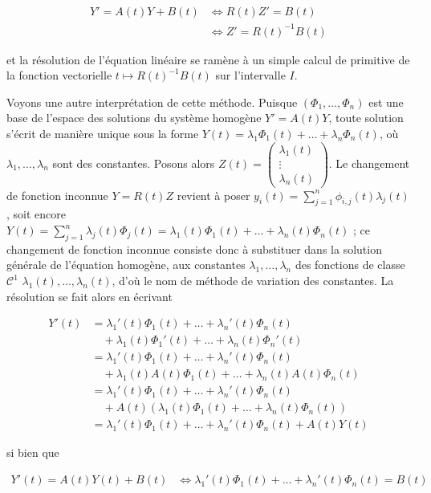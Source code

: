 \begin{align*} 
Y' = A(t)Y + B(t) &\Leftrightarrow R(t)Z' = B(t) \\
&\Leftrightarrow Z' = R(t)^{-1}B(t)
\end{align*}

et la résolution de l'équation linéaire se ramène à un simple calcul de
primitive de la fonction vectorielle
$t \mapsto R(t)^{-1}B(t)$ sur l'intervalle $I$.

Voyons une autre interprétation de cette méthode. Puisque
$(\Phi_1,\ldots,\Phi_n)$
est une base de l'espace des solutions du système homogène $Y' = A(t)Y$,
toute solution s'écrit de manière unique sous la forme $Y(t) =
\lambda_1\Phi_1(t) + \ldots + \lambda_n\Phi_n(t)$,
où
$\lambda_1,\ldots,\lambda_n$
sont des constantes. Posons alors $Z(t) = \begin{pmatrix} \lambda_1(t) \\ \vdots \\ \lambda_n(t) \end{pmatrix}$. Le
changement de fonction inconnue $Y = R(t)Z$ revient à poser
$y_i(t) = \sum_{j=1}^n \phi_{i,j}(t)\lambda_j(t)$, soit encore $Y(t) = \sum_{j=1}^n \lambda_j(t)\Phi_j(t) = \lambda_1(t)\Phi_1(t) + \ldots + \lambda_n(t)\Phi_n(t)$ ; ce changement de fonction inconnue
consiste donc à substituer dans la solution générale de l'équation
homogène, aux constantes
$\lambda_1,\ldots,\lambda_n$
des fonctions de classe $\mathcal{C}^1$
$\lambda_1(t),\ldots,\lambda_n(t)$,
d'où le nom de méthode de variation des constantes. La résolution se
fait alors en écrivant

\begin{align*} 
Y'(t) &= \lambda_1'(t)\Phi_1(t) + \ldots + \lambda_n'(t)\Phi_n(t) \\
&\quad + \lambda_1(t)\Phi_1'(t) + \ldots + \lambda_n(t)\Phi_n'(t) \\
&= \lambda_1'(t)\Phi_1(t) + \ldots + \lambda_n'(t)\Phi_n(t) \\
&\quad + \lambda_1(t)A(t)\Phi_1(t) + \ldots + \lambda_n(t)A(t)\Phi_n(t) \\
&= \lambda_1'(t)\Phi_1(t) + \ldots + \lambda_n'(t)\Phi_n(t) \\
&\quad + A(t)(\lambda_1(t)\Phi_1(t) + \ldots + \lambda_n(t)\Phi_n(t)) \\
&= \lambda_1'(t)\Phi_1(t) + \ldots + \lambda_n'(t)\Phi_n(t) + A(t)Y(t)
\end{align*}

si bien que

\begin{align*} 
Y'(t) = A(t)Y(t) + B(t) &\Leftrightarrow \lambda_1'(t)\Phi_1(t) + \ldots + \lambda_n'(t)\Phi_n(t) = B(t)
\end{align*}

